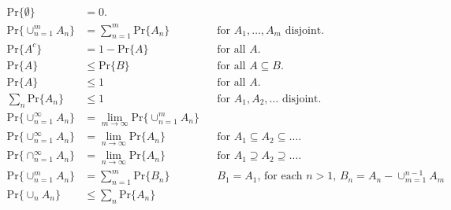 \documentclass[UTF8]{article}
\begin{document}
    \setcounter{equation}{1}
    \begin{align}
        \label{eq:2}
        \text{Pr}\{\emptyset\} &= 0.\\
        \label{eq:3}
        \text{Pr}\big\{\cup^m_{n=1}A_n\big\}&=\sum^{m}_{n=1}\text{Pr}\{A_n\} && \text{for $A_1,\dots,A_m$ disjoint.}\\
        \label{eq:4}
        \text{Pr}\{A^c\}&=1-\text{Pr}\{A\}& &\text{for all $A$.}\\
        \label{eq:5}
        \text{Pr}\{A\}&\leq\text{Pr}\{B\}&&\text{for all $A\subseteq B$.}\\
        \label{eq:6}
        \text{Pr}\{A\}&\leq 1 && \text{for all $A$.}\\
        \label{eq:7}
        \sum_n\text{Pr}\{A_n\}&\leq1&&\text{for $A_1,A_2,\dots$ disjoint.}\\
        \label{eq:8}
        \text{Pr}\big\{\cup^\infty_{n=1}A_n\big\}&=\lim_{m\rightarrow\infty}\text{Pr}\{\cup^m_{n=1}A_n\}\\
        \label{eq:9}
        \text{Pr}\big\{\cup^\infty_{n=1}A_n\big\}&=\lim_{n\rightarrow\infty}\text{Pr}\{A_n\}&&\text{for $A_1\subseteq A_2\subseteq\dots$.}\\
        \label{eq:10}
        \text{Pr}\big\{\cap^\infty_{n=1}A_n\big\}&=\lim_{n\rightarrow\infty}\text{Pr}\{A_n\} && \text{for $A_1\supseteq A_2\supseteq\dots$.}\\
        \label{eq:11}
        \text{Pr}\{\cup^m_{n=1}A_n\}&=\sum^m_{n=1}\text{Pr}\{B_n\}&&\text{$B_1=A_1$, for each $n>1$, $B_n=A_n-\cup^{n-1}_{m=1}A_m$}\\
        \label{eq:12}
        \text{Pr}\{\cup_nA_n\}&\leq\sum_n\text{Pr}\{A_n\}
    \end{align}
\end{document}
